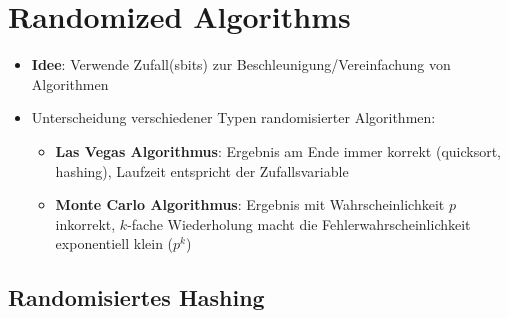 \section{Randomized Algorithms}%
\label{ra:sec:randomized_algorithms}

\begin{itemize}
	\item \textbf{Idee}: Verwende Zufall(sbits) zur Beschleunigung/Vereinfachung von Algorithmen
	\item Unterscheidung verschiedener Typen randomisierter Algorithmen:
	\begin{itemize}
		\item \textbf{Las Vegas Algorithmus}: Ergebnis am Ende immer korrekt (quicksort, hashing), Laufzeit entspricht der Zufallsvariable
		\item \textbf{Monte Carlo Algorithmus}: Ergebnis mit Wahrscheinlichkeit $p$ inkorrekt, $k$-fache Wiederholung macht die Fehlerwahrscheinlichkeit exponentiell klein ($p^k$)
	\end{itemize}
\end{itemize}

\subsection{Randomisiertes Hashing}%
\label{ra:sub:randomisiertes_hashing}

